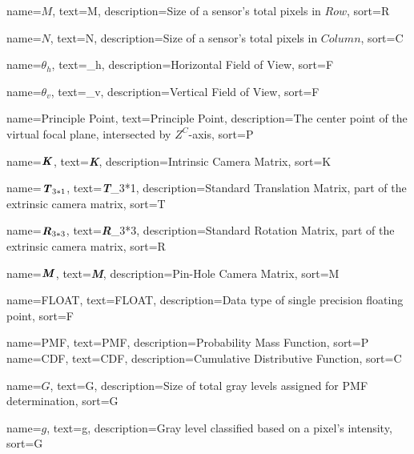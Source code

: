 %
{%
  name={$M$},
  text={M},
  description={Size of a sensor's total pixels in $Row$},
  sort={R}
}

%
{%
  name={$N$},
  text={N},
  description={Size of a sensor's total pixels in $Column$},
  sort={C}
}

%
{%
  name={$\theta_h$},
  text={\theta_h},
  description={Horizontal Field of View},
  sort={F}
}

%
{%
  name={$\theta_v$},
  text={\theta_v},
  description={Vertical Field of View},
  sort={F}
}


%
{%
  name={Principle Point},
  text={Principle Point},
  description={The center point of the virtual focal plane, intersected by $Z^C$-axis},
  sort={P}
}

%
{%
  name={$\textbf{\textit{K}}$},
  text={\textbf{\textit{K}}},
  description={Intrinsic Camera Matrix},
  sort={K}
}


%
{%
  name={$\textbf{\textit{T}}_{3*1}$},
  text={\textbf{\textit{T}}_{3*1}},
  description={Standard Translation Matrix, part of the extrinsic camera matrix},
  sort={T}
}

%
{%
  name={$\textbf{\textit{R}}_{3*3}$},
  text={\textbf{\textit{R}}_{3*3}},
  description={Standard Rotation Matrix, part of the extrinsic camera matrix},
  sort={R}
}

%
{%
  name={$\textbf{\textit{M}}$},
  text={\textbf{\textit{M}}},
  description={Pin-Hole Camera Matrix},
  sort={M}
}

%
{%
  name={FLOAT},
  text={FLOAT},
  description={Data type of single precision floating point},
  sort={F}
}

%
{%
  name={PMF},
  text={PMF},
  description={Probability Mass Function},
  sort={P}
}
%
{%
  name={CDF},
  text={CDF},
  description={Cumulative Distributive Function},
  sort={C}
}

%
{%
  name={$G$},
  text={G},
  description={Size of total gray levels assigned for \gls{PMF} determination},
  sort={G}
}

%
{%
  name={$g$},
  text={g},
  description={Gray level classified based on a pixel's intensity},
  sort={G}
}












